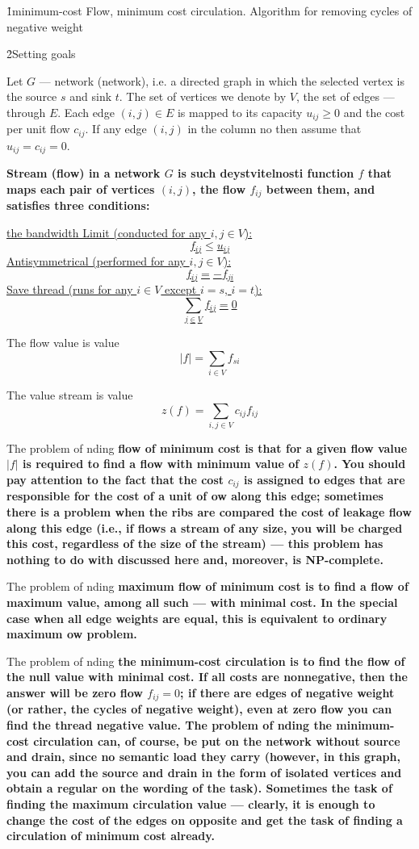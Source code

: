 \h1{minimum-cost Flow, minimum cost circulation. Algorithm for removing cycles of negative weight}

\h2{Setting goals}

Let $G$ --- network (network), i.e. a directed graph in which the selected vertex is the source $s$ and sink $t$. The set of vertices we denote by $V$, the set of edges --- through $E$. Each edge $(i,j) \in E$ is mapped to its capacity $u_{ij} \ge 0$ and the cost per unit flow $c_{ij}$. If any edge $(i,j)$ in the column no then assume that $u_{ij} = c_{ij} = 0$.

\bf{Stream} (flow) in a network $G$ is such deystvitelnosti function $f$ that maps each pair of vertices $(i,j)$, the flow $f_{ij}$ between them, and satisfies three conditions:

\ul{
\li the bandwidth Limit (conducted for any $i, j \in V$):
$$ f_{ij} \le u_{ij} $$
\li Antisymmetrical (performed for any $i, j \in V$):
$$ f_{ij} = - f_{ji} $$
\li Save thread (runs for any $i \in V$ except $i=s$, $i=t$):
$$ \sum_{j \in V} f_{ij} = 0 $$
}

The flow value is value
$$ |f| = \sum_{i \in V} f_{si} $$

The value stream is value
$$ z(f) = \sum_{i,j \in V} c_{ij} f_{ij} $$

The problem of nding \bf{flow of minimum cost} is that for a given flow value $|f|$ is required to find a flow with minimum value of $z(f)$. You should pay attention to the fact that the cost $c_{ij}$ is assigned to edges that are responsible for the cost of a unit of ow along this edge; sometimes there is a problem when the ribs are compared the cost of leakage flow along this edge (i.e., if flows a stream of any size, you will be charged this cost, regardless of the size of the stream) --- this problem has nothing to do with discussed here and, moreover, is NP-complete.

The problem of nding \bf{maximum flow of minimum cost} is to find a flow of maximum value, among all such --- with minimal cost. In the special case when all edge weights are equal, this is equivalent to ordinary maximum ow problem.

The problem of nding \bf{the minimum-cost circulation} is to find the flow of the null value with minimal cost. If all costs are nonnegative, then the answer will be zero flow $f_{ij}=0$; if there are edges of negative weight (or rather, the cycles of negative weight), even at zero flow you can find the thread negative value. The problem of nding the minimum-cost circulation can, of course, be put on the network without source and drain, since no semantic load they carry (however, in this graph, you can add the source and drain in the form of isolated vertices and obtain a regular on the wording of the task). Sometimes the task of finding the maximum circulation value --- clearly, it is enough to change the cost of the edges on opposite and get the task of finding a circulation of minimum cost already.

